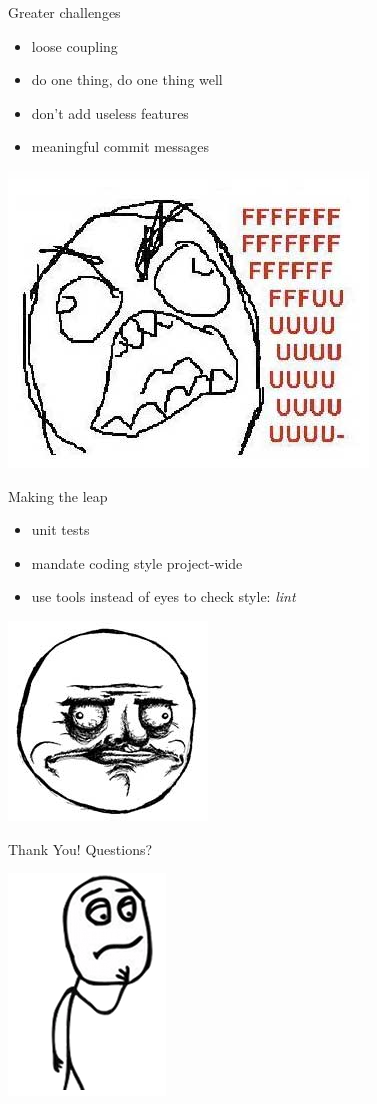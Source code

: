 \documentclass{beamer}
\begin{document}
\begin{frame}{Greater challenges}
  \begin{itemize}
    \pause
    \item loose coupling
    \pause
    \item do one thing, do one thing well
    \pause
    \item don't add useless features
    \pause
    \item meaningful commit messages
  \end{itemize}
  \pause
  \begin{center}
    \includegraphics[scale=0.3]{fuuu}
  \end{center}
\end{frame}

\begin{frame}{Making the leap}
  \begin{itemize}
    \pause
    \item unit tests
    \pause
    \item mandate coding style project-wide
    \pause
    \item use tools instead of eyes to check style: \emph{lint}
    \pause
  \end{itemize}
  \begin{center}
    \includegraphics[scale=0.6]{megusta}
  \end{center}
\end{frame}

\begin{frame}{Thank You!}
  \pause
  \Huge Questions?
  \begin{center}
    \includegraphics[scale=0.6]{conflicting}
  \end{center}
\end{frame}
\end{document}
